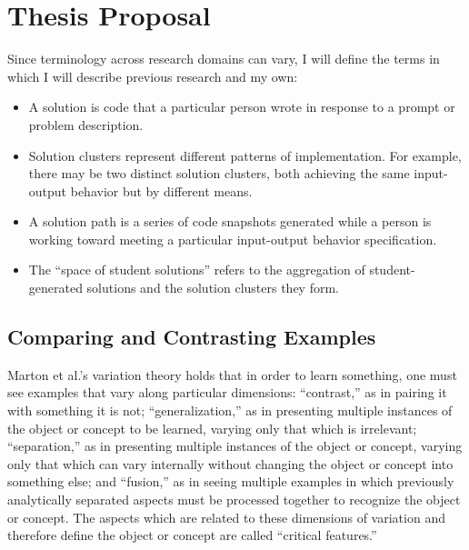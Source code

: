 \section{Thesis Proposal}



Since terminology across research domains can vary, I will define the terms in which I will describe previous research and my own: 
\begin{itemize}
\item A solution is code that a particular person wrote in response to a prompt or problem description.
\item Solution clusters represent different patterns of implementation. For example, there may be two distinct solution clusters, both achieving the same input-output behavior but by different means. 
\item A solution path is a series of code snapshots generated while a person is working toward meeting a particular input-output behavior specification. 
\item The ``space of student solutions'' refers to the aggregation of student-generated solutions and the solution clusters they form.
\end{itemize}

\subsection{Comparing and Contrasting Examples}


Marton et al.'s variation theory \cite{Marton13} holds that in order to learn something, one must see examples that vary along particular dimensions: ``contrast,'' as in pairing it with something it is not; ``generalization,'' as in presenting multiple instances of the object or concept to be learned, varying only that which is irrelevant; ``separation,'' as in presenting multiple instances of the object or concept, varying only that which can vary internally without changing the object or concept into something else; and ``fusion,'' as in seeing multiple examples in which previously analytically separated aspects must be processed together to recognize the object or concept. The aspects which are related to these dimensions of variation and therefore define the object or concept are called ``critical features.''

